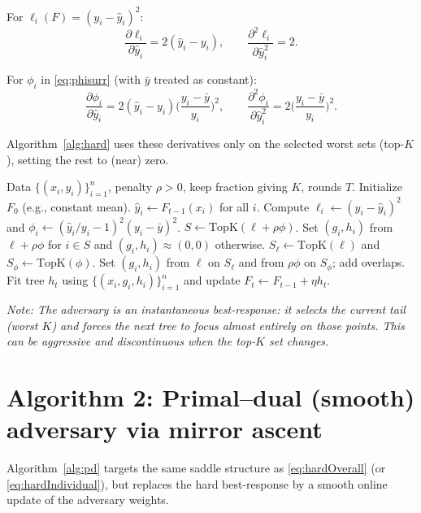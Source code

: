\documentclass[11pt]{article}
\newcommand{\yh}{\hat y}
\theoremstyle{plain}
\theoremstyle{definition}
\newcommand{\1}{\mathbf{1}}
\begin{document}
For $\ell_i(F)=(y_i-\yh_i)^2$:
\begin{equation}
\frac{\partial \ell_i}{\partial \yh_i} = 2(\yh_i-y_i),
\qquad
\frac{\partial^2 \ell_i}{\partial \yh_i^2} = 2.
\end{equation}

For $\phi_i$ in \eqref{eq:phisurr} (with $\bar y$ treated as constant):
\begin{equation}
\frac{\partial \phi_i}{\partial \yh_i} = 2(\yh_i-y_i)\Big(\frac{y_i-\bar y}{y_i}\Big)^2,
\qquad
\frac{\partial^2 \phi_i}{\partial \yh_i^2} = 2\Big(\frac{y_i-\bar y}{y_i}\Big)^2.
\end{equation}

Algorithm~\ref{alg:hard} uses these derivatives only on the selected worst sets (top-$K$), setting the rest to (near) zero.

\begin{algorithm}[!ht]
\caption{Hard best-response top-$K$ robust boosting (sketch)}
\label{alg:hard}
\begin{algorithmic}[1]
\Require Data $\{(x_i,y_i)\}_{i=1}^n$, penalty $\rho>0$, keep fraction giving $K$, rounds $T$.
\State Initialize $F_0$ (e.g., constant mean).
\State $\yh_i \gets F_{t-1}(x_i)$ for all $i$.
\State Compute $\ell_i \gets (y_i-\yh_i)^2$ and $\phi_i \gets (\yh_i/y_i-1)^2(y_i-\bar y)^2$.
\State $S \gets \mathrm{TopK}(\ell + \rho\phi)$.
\State Set $(g_i,h_i)$ from $\ell+\rho\phi$ for $i\in S$ and $(g_i,h_i)\approx(0,0)$ otherwise.
\Else {}
\State $S_\ell \gets \mathrm{TopK}(\ell)$ and $S_\phi \gets \mathrm{TopK}(\phi)$.
\State Set $(g_i,h_i)$ from $\ell$ on $S_\ell$ and from $\rho\phi$ on $S_\phi$; add overlaps.
\EndIf
\State Fit tree $h_t$ using $\{(x_i,g_i,h_i)\}_{i=1}^n$ and update $F_t \gets F_{t-1} + \eta h_t$.
\EndFor
\end{algorithmic}
\end{algorithm}
\textit{Note:
The adversary is an instantaneous best-response: it selects the current tail (worst $K$) and forces the next tree to focus almost entirely on those points. This can be aggressive and discontinuous when the top-$K$ set changes.
}
\section{Algorithm 2: Primal--dual (smooth) adversary via mirror ascent}

Algorithm~\ref{alg:pd} targets the same saddle structure as \eqref{eq:hardOverall} (or \eqref{eq:hardIndividual}), but replaces the hard best-response by a smooth online update of the adversary weights.
\end{document}
